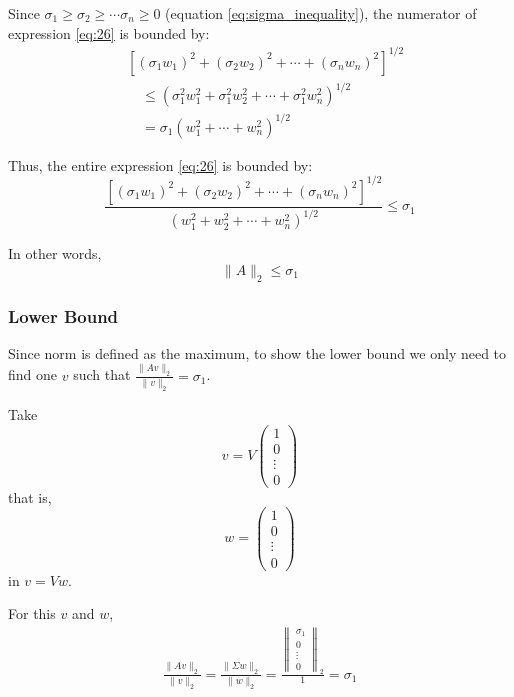 \documentclass[12pt,letterpaper]{article}
\begin{document}
Since $\sigma_1 \geq \sigma_2 \geq \cdots \sigma_n \geq 0$ (equation \ref{eq:sigma_inequality}), the numerator of expression \ref{eq:26} is bounded by:
\begin{align}
	&\left[(\sigma_1 w_1)^2 + (\sigma_2 w_2)^2 + \cdots + (\sigma_n w_n)^2\right]^{1/2} \\
	&\quad \leq (\sigma_1^2 w_1^2 + \sigma_1^2 w_2^2 + \cdots + \sigma_1^2 w_n^2)^{1/2} \\
	&\quad = \sigma_1 (w_1^2 + \cdots + w_n^2)^{1/2}
\end{align}

Thus, the entire expression \ref{eq:26} is bounded by:
\begin{equation}
	\frac{\left[(\sigma_1 w_1)^2 + (\sigma_2 w_2)^2 + \cdots + (\sigma_n w_n)^2\right]^{1/2}}{(w_1^2 + w_2^2 + \cdots + w_n^2)^{1/2}} \leq \sigma_1
\end{equation}

In other words,
\begin{equation}
	\lVert A \rVert_2 \leq \sigma_1
\end{equation}

\subsubsection{Lower Bound}
Since norm is defined as the maximum, to show the lower bound we only need to find one $v$ such that $\frac{\lVert A v \rVert_2}{\lVert v \rVert_2} = \sigma_1$.

Take
\begin{equation}
v = V \begin{pmatrix}
	1 \\ 0 \\ \vdots \\ 0
\end{pmatrix}
\end{equation}
that is,
\begin{equation}
w = \begin{pmatrix}
	1 \\ 0 \\ \vdots \\ 0
\end{pmatrix}
\end{equation}
in $v = Vw$.

For this $v$ and $w$,
\begin{align}
	\frac{\lVert A v \rVert_2}{\lVert v \rVert_2} = \frac{\lVert \Sigma w \rVert_2}{\lVert w \rVert_2}
	= \frac{\left\lVert \begin{array}{c}
		\sigma_1 \\ 0 \\ \vdots \\ 0
	\end{array} \right\rVert_2}{1} = \sigma_1
\end{align}
\end{document}
